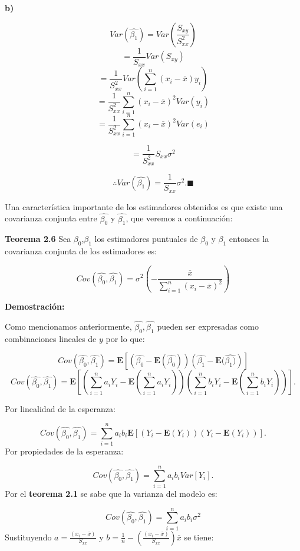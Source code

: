 \documentclass[
  a4paper,
  oneside,
  openany]{book}
\begin{document}
\textbf{b)}

\[Var\left(\hat{\beta_{1}}\right)= Var\left( \frac{S_{xy}}{S_{xx}^2}\right)\]
\[= \frac{1}{S_{xx}}Var\left(S_{xy}\right)\]
\[=\frac{1}{S_{xx}^2}Var\left( \sum_{i=1}^{n}(x_{i}-\overline{x})y_{i}\right)\]
\[=\frac{1}{S_{xx}^2} \sum_{i=1}^{n}(x_{i}-\overline{x})^2Var(y_{i})\]
\[=\frac{1}{S_{xx}^2}\sum_{i=1}^{n}(x_{i}-\overline{x})^2Var(e_{i})\]

\[=\frac{1}{S_{xx}^2}S_{xx}\sigma^2\]

\[\therefore Var\left(\hat{\beta_{1}}\right)= \frac{1}{S_{xx}} \sigma^2. \blacksquare\]

Una característica importante de los estimadores obtenidos es que existe una covarianza conjunta entre \(\hat{\beta_{0}}\) y \(\hat{\beta_{1}}\), que veremos a continuación:

\textbf{Teorema 2.6} Sea \(\beta_{0}\),\(\beta_{1}\) los estimadores puntuales de \(\beta_{0}\) y \(\beta_{1}\) entonces la covarianza conjunta de los estimadores es:

\[Cov\left(\hat{\beta_{0}},\hat{\beta_{1}}\right)=\sigma^2\left(-\frac{\overline{x}}{\sum_{i=1}^{n}(x_{i}-\overline{x})^2}\right)\]

\textbf{Demostración:}

Como mencionamos anteriormente, \(\hat{\beta_{0}},\hat{\beta_{1}}\) pueden ser expresadas como combinaciones lineales de \(y\) por lo que:

\[Cov\left(\hat{\beta_{0}},\hat{\beta_{1}} \right)= \mathbf{E}\left[ \left( \hat{\beta_{0}}-\mathbf{E}(\hat{\beta_{0}})\right)\left(\hat{\beta_{1}}-\mathbf{E}(\hat{\beta_{1})} \right) \right]\]
\[Cov\left(\hat{\beta_{0}},\hat{\beta_{1}} \right)= \mathbf{E}\left[\left(\sum_{i=1}^{n}a_{i}Y_{i}-\mathbf{E}(\sum_{i=1}^{n}a_{i}Y_{i}) \right)\left(\sum_{i=1}^{n}b_{i}Y_{i}-\mathbf{E}(\sum_{i=1}^{n}b_{i}Y_{i}) \right)\right].\]

Por linealidad de la esperanza:

\[Cov\left(\hat{\beta_{0}},\hat{\beta_{1}}\right)=\sum_{i=1}^{n}a_{i}b_{i}\mathbf{E}[(Y_{i}-\mathbf{E}(Y_{i}))(Y_{i}-\mathbf{E}(Y_{i}))].\]
Por propiedades de la esperanza:

\[Cov\left(\hat{\beta_{0}},\hat{\beta_{1}}\right)=\sum_{i=1}^{n}a_{i}b_{i}Var[Y_{i}].\]
Por el \textbf{teorema 2.1} se sabe que la varianza del modelo es:

\[Cov\left(\hat{\beta_{0}},\hat{\beta_{1}}\right)=\sum_{i=1}^{n}a_{i}b_{i}\sigma^2\]
Sustituyendo \(a=\frac{(x_{i}-\overline{x})}{S_{xx}}\) y \(b=\frac{1}{n}-\left(\frac{(x_{i}-\overline{x})}{S_{xx}}\right)\overline{x}\) se tiene:
\end{document}
